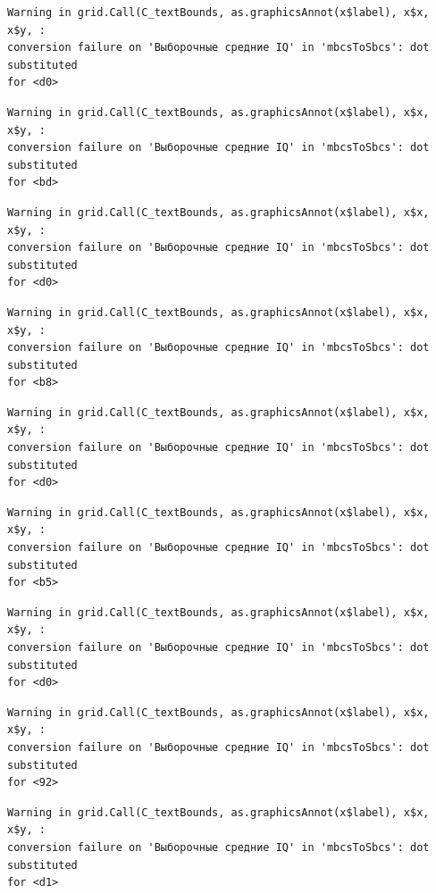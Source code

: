 \documentclass[
  letterpaper,
  DIV=11,
  numbers=noendperiod]{scrreprt}
\theoremstyle{definition}
\theoremstyle{remark}
\begin{document}
\begin{verbatim}
Warning in grid.Call(C_textBounds, as.graphicsAnnot(x$label), x$x, x$y, :
conversion failure on 'Выборочные средние IQ' in 'mbcsToSbcs': dot substituted
for <d0>
\end{verbatim}

\begin{verbatim}
Warning in grid.Call(C_textBounds, as.graphicsAnnot(x$label), x$x, x$y, :
conversion failure on 'Выборочные средние IQ' in 'mbcsToSbcs': dot substituted
for <bd>
\end{verbatim}

\begin{verbatim}
Warning in grid.Call(C_textBounds, as.graphicsAnnot(x$label), x$x, x$y, :
conversion failure on 'Выборочные средние IQ' in 'mbcsToSbcs': dot substituted
for <d0>
\end{verbatim}

\begin{verbatim}
Warning in grid.Call(C_textBounds, as.graphicsAnnot(x$label), x$x, x$y, :
conversion failure on 'Выборочные средние IQ' in 'mbcsToSbcs': dot substituted
for <b8>
\end{verbatim}

\begin{verbatim}
Warning in grid.Call(C_textBounds, as.graphicsAnnot(x$label), x$x, x$y, :
conversion failure on 'Выборочные средние IQ' in 'mbcsToSbcs': dot substituted
for <d0>
\end{verbatim}

\begin{verbatim}
Warning in grid.Call(C_textBounds, as.graphicsAnnot(x$label), x$x, x$y, :
conversion failure on 'Выборочные средние IQ' in 'mbcsToSbcs': dot substituted
for <b5>
\end{verbatim}

\begin{verbatim}
Warning in grid.Call(C_textBounds, as.graphicsAnnot(x$label), x$x, x$y, :
conversion failure on 'Выборочные средние IQ' in 'mbcsToSbcs': dot substituted
for <d0>
\end{verbatim}

\begin{verbatim}
Warning in grid.Call(C_textBounds, as.graphicsAnnot(x$label), x$x, x$y, :
conversion failure on 'Выборочные средние IQ' in 'mbcsToSbcs': dot substituted
for <92>
\end{verbatim}

\begin{verbatim}
Warning in grid.Call(C_textBounds, as.graphicsAnnot(x$label), x$x, x$y, :
conversion failure on 'Выборочные средние IQ' in 'mbcsToSbcs': dot substituted
for <d1>
\end{verbatim}
\end{document}
